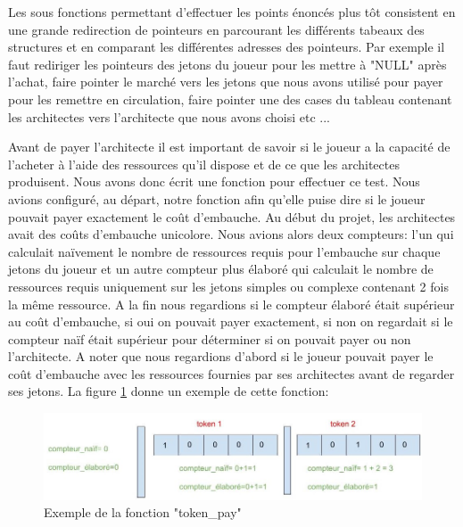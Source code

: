 \documentclass{article}
\begin{document}
    \vspace{1em}  Les sous fonctions permettant d'effectuer les points énoncés plus tôt consistent en une grande redirection de pointeurs en parcourant les différents tabeaux des structures et en comparant les différentes adresses des pointeurs. Par exemple il faut rediriger les pointeurs des jetons du joueur pour les mettre à "NULL" après l'achat, faire pointer le marché vers les jetons que nous avons utilisé pour payer pour les remettre en circulation, faire pointer une des cases du tableau contenant les architectes vers l'architecte que nous avons choisi etc ...
    
    \vspace{1em} Avant de payer l'architecte il est important de savoir si le joueur a la capacité de l'acheter à l'aide des ressources qu'il dispose et de ce que les architectes produisent. Nous avons donc écrit une fonction pour effectuer ce test. Nous avions configuré, au départ, notre fonction afin qu'elle puise dire si le joueur pouvait payer exactement le coût d'embauche. Au début du projet, les architectes avait des coûts d'embauche unicolore. Nous avions alors deux compteurs: l'un qui calculait naïvement le nombre de ressources requis pour l'embauche sur chaque jetons du joueur et un autre compteur plus élaboré qui calculait le nombre de ressources requis uniquement sur les jetons simples ou complexe contenant 2 fois la même ressource. A la fin nous regardions si le compteur élaboré était supérieur au coût d'embauche, si oui on pouvait payer exactement, si non on regardait si le compteur naïf était supérieur pour déterminer si on pouvait payer ou non l'architecte. A noter que nous regardions d'abord si le joueur pouvait payer le coût d'embauche avec les ressources fournies par ses architectes avant de regarder ses jetons.
    La figure \ref{token_pay1} donne un exemple de cette fonction:

        \begin{figure}[!ht]
            \centering
            \includegraphics[width=0.7\linewidth]{token_pay1.jpg}
            \caption{Exemple de la fonction "token\_pay"}
            \label{token_pay1}
        \end{figure}

\vspace{2cm}
\end{document}
